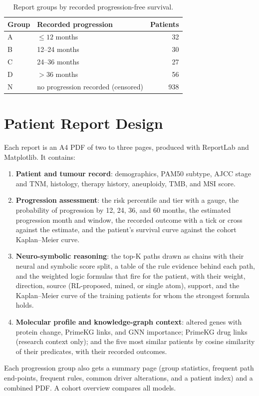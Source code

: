 \documentclass{mnnit}
\begin{document}
\begin{table}[htbp]
  \centering
  \small\setlength{\tabcolsep}{4pt}
  \caption{Report groups by recorded progression-free survival.}
  \label{tab:groups}
  \begin{tabular}{llr}
    \toprule
    Group & Recorded progression & Patients \\
    \midrule
    A & $\le 12$ months & 32 \\
    B & 12--24 months & 30 \\
    C & 24--36 months & 27 \\
    D & $> 36$ months & 56 \\
    N & no progression recorded (censored) & 938 \\
    \bottomrule
  \end{tabular}
\end{table}

\section{Patient Report Design}
Each report is an A4 PDF of two to three pages, produced with ReportLab and Matplotlib. It contains:
\begin{enumerate}
  \item \textbf{Patient and tumour record}: demographics, PAM50 subtype, AJCC stage and TNM, histology, therapy
        history, aneuploidy, TMB, and MSI score.
  \item \textbf{Progression assessment}: the risk percentile and tier with a gauge, the probability of progression
        by 12, 24, 36, and 60 months, the estimated progression month and window, the recorded outcome with a
        tick or cross against the estimate, and the patient's survival curve against the cohort Kaplan--Meier curve.
  \item \textbf{Neuro-symbolic reasoning}: the top-K paths drawn as chains with their neural and symbolic score
        split, a table of the rule evidence behind each path, and the weighted logic formulas that fire for
        the patient, with their weight, direction, source (RL-proposed, mined, or single atom), support, and the
        Kaplan--Meier curve of the training patients for whom the strongest formula holds.
  \item \textbf{Molecular profile and knowledge-graph context}: altered genes with protein change, PrimeKG links,
        and GNN importance; PrimeKG drug links (research context only); and the five most similar patients by
        cosine similarity of their predicates, with their recorded outcomes.
\end{enumerate}
Each progression group also gets a summary page (group statistics, frequent path end-points, frequent rules,
common driver alterations, and a patient index) and a combined PDF. A cohort overview compares all models.
\end{document}
